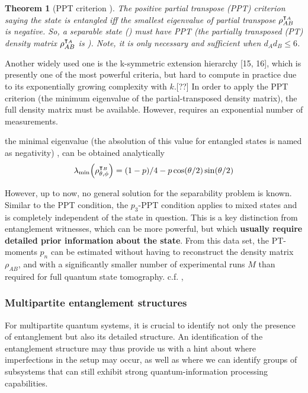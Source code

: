 \documentclass[
10pt,
aps,
pra,
linenumbers,
floatfix,
]{revtex4-2}
\theoremstyle{plain}
\newtheorem{theorem}{Theorem}
\theoremstyle{definition}
\newtheorem{remark}{Remark}
\newcommand{\ppt}{\textup{PPT}}
\newcommand{\dm}{\rho}
\begin{document}
\begin{theorem}[PPT criterion \cite{horodeckiSeparabilityMixedStates1996}]\label{thm:ppt}
	The positive partial transpose (\ppt) criterion saying the state is entangled iff the smallest eigenvalue of partial transpose $\dm_{AB}^{\T_A}$ is negative. 
	So, a separable state () must have PPT (the partially transposed (PT) density matrix $\dm_{AB}^{\T_A}$ is ).
	Note, it is only necessary and sufficient when $d_A d_B \le 6$.
\end{theorem}
Another widely used one is the k-symmetric extension hierarchy [15, 16], which is presently one of the most powerful criteria, but hard to compute in practice due to its exponentially growing complexity with $k$.[??]
In order to apply the PPT criterion (the minimum eigenvalue of the partial-transposed density matrix), the full density matrix must be available. However,  requires an exponential number of measurements.

the minimal eigenvalue (the absolution of this value for entangled states is named as negativity) , can be obtained analytically 
\begin{equation}
	\lambda_{\min}\qty(\dm_{\theta,\phi}^{\T_B}) = 
	(1-p)/4 - p \cos(\theta/2) \sin(\theta/2)
\end{equation}
\cite{maTransformingBellInequalities2018}

However, up to now, no general solution for the separability problem is known.
Similar to the PPT condition, the $p_3$-PPT condition applies to mixed states and is completely independent of the state in question. This is a key distinction from entanglement witnesses, which can be more powerful, but which \textbf{usually require detailed prior information about the state}.
From this data set, the PT-moments $p_n$ can be estimated without having to reconstruct the density matrix $\dm_{AB}$, and with a significantly smaller number of experimental runs $M$ than required for full quantum state tomography.
c.f. , 

\subsubsection{Multipartite entanglement structures}
For multipartite quantum systems, it is crucial to identify not only the presence of entanglement but also its detailed structure.
An identification of the entanglement structure may thus provide us with a hint about where imperfections in the setup may occur, as well as where we can identify groups of subsystems that can still exhibit strong quantum-information processing capabilities.
\end{document}
